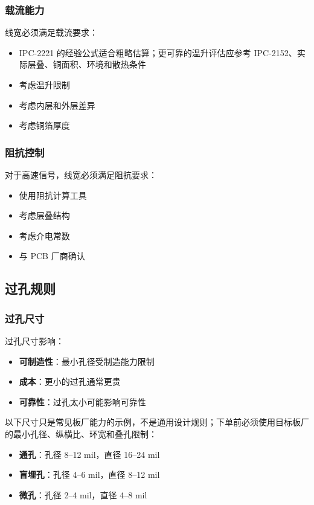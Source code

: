 \subsubsection{载流能力}

线宽必须满足载流要求：

\begin{itemize}
  \item IPC-2221 的经验公式适合粗略估算；更可靠的温升评估应参考 IPC-2152、实际层叠、铜面积、环境和散热条件
  \item 考虑温升限制
  \item 考虑内层和外层差异
  \item 考虑铜箔厚度
\end{itemize}

\subsubsection{阻抗控制}

对于高速信号，线宽必须满足阻抗要求：

\begin{itemize}
  \item 使用阻抗计算工具
  \item 考虑层叠结构
  \item 考虑介电常数
  \item 与 PCB 厂商确认
\end{itemize}

\subsection{过孔规则}

\subsubsection{过孔尺寸}

过孔尺寸影响：

\begin{itemize}
  \item \textbf{可制造性}：最小孔径受制造能力限制
  \item \textbf{成本}：更小的过孔通常更贵
  \item \textbf{可靠性}：过孔太小可能影响可靠性
\end{itemize}

以下尺寸只是常见板厂能力的示例，不是通用设计规则；下单前必须使用目标板厂的最小孔径、纵横比、环宽和叠孔限制：

\begin{itemize}
  \item \textbf{通孔}：孔径 8--12 mil，直径 16--24 mil
  \item \textbf{盲埋孔}：孔径 4--6 mil，直径 8--12 mil
  \item \textbf{微孔}：孔径 2--4 mil，直径 4--8 mil
\end{itemize}

